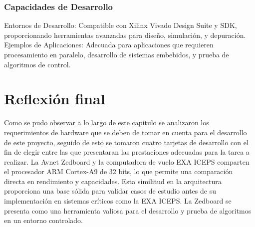 \subsubsection{Capacidades de Desarrollo}
Entornos de Desarrollo: Compatible con Xilinx Vivado Design Suite y SDK, proporcionando herramientas avanzadas para diseño, simulación, y depuración.
Ejemplos de Aplicaciones: Adecuada para aplicaciones que requieren procesamiento en paralelo, desarrollo de sistemas embebidos, y prueba de algoritmos de control.

\section{Reflexión final}

Como se pudo observar a lo largo de este capítulo se analizaron los requerimientos de hardware que se deben de tomar en cuenta para el desarrollo de este proyecto, seguido de esto se tomaron cuatro tarjetas de desarrollo con el fin de elegir entre las que presentaran las prestaciones adecuadas para la tarea a realizar. La Avnet Zedboard y la computadora de vuelo EXA ICEPS comparten el procesador ARM Cortex-A9 de 32 bits, lo que permite una comparación directa en rendimiento y capacidades. Esta similitud en la arquitectura proporciona una base sólida para validar casos de estudio antes de su implementación en sistemas críticos como la EXA ICEPS. La Zedboard se presenta como una herramienta valiosa para el desarrollo y prueba de algoritmos en un entorno controlado.